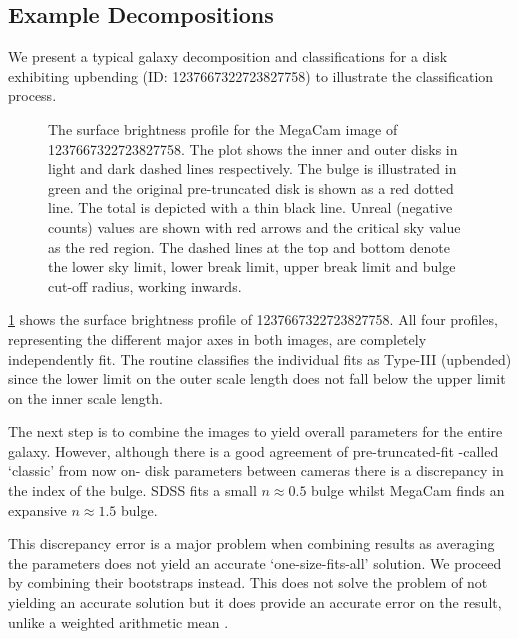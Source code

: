 

\subsection{Example Decompositions} %
\label{sub:example_decompositions}
We present a typical galaxy decomposition and classifications for a disk exhibiting upbending (ID: 1237667322723827758) to illustrate the classification process. 

\begin{figure}
	\label{fig: The mega and sdss profiles of 1237667322723827758}
	\caption{The surface brightness profile for the MegaCam image of 1237667322723827758. The plot shows the inner and outer disks in light and dark dashed lines respectively. The bulge is illustrated in green and the original pre-truncated disk is shown as a red dotted line. The total is depicted with a thin black line.
	 Unreal (negative counts) values are shown with red arrows and the critical sky value as the red region. The dashed lines at the top and bottom denote the lower sky limit, lower break limit, upper break limit and bulge cut-off radius, working inwards.}
\end{figure}

\ref{fig: The mega and sdss profiles of 1237667322723827758} shows the surface brightness profile of 1237667322723827758. All four profiles, representing the different major axes in both images, are completely independently fit. The routine classifies the individual fits as Type-III (upbended) since the lower limit on the outer scale length does not fall below the upper limit on the inner scale length. 

The next step is to combine the images to yield overall parameters for the entire galaxy. However, although there is a good agreement of pre-truncated-fit -called `classic' from now on- disk parameters between cameras there is a discrepancy in the \sersic index of the bulge. SDSS fits a small $n\approx 0.5$ bulge whilst MegaCam finds an expansive $n\approx 1.5$ bulge. 

This discrepancy error is a major problem when combining results as averaging the parameters does not yield an accurate `one-size-fits-all' solution. We proceed by combining their bootstraps instead. This does not solve the problem of not yielding an accurate solution but it does provide an accurate error on the result, unlike a weighted arithmetic mean \citep{andrae_error_2010}.



